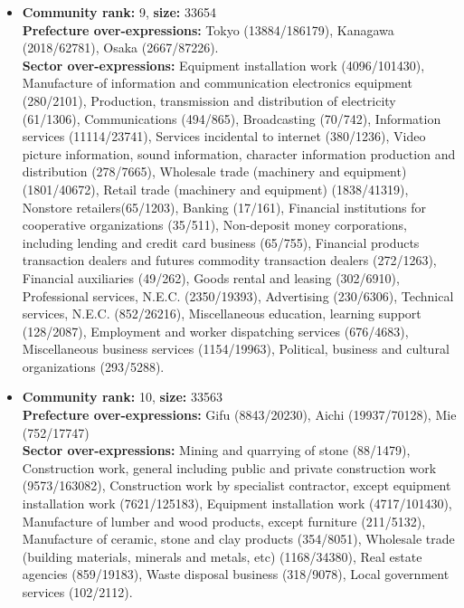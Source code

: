 \documentclass[pre,floatfix,twocolumn,showpacs,a4paper,nofootinbib]{revtex4}
\begin{document}
\begin {itemize}
 Wholesale trade, general merchandise (246/4891), Miscellaneous wholesale trade (2373/34637), Miscellaneous retail trade (4586/63111),
 Nonstore retailers (256/1203), Financial products transaction dealers and futures commodity transaction dealers (72/1263), 
 Goods rental and leasing (483/6910), Professional services, N.E.C. (2821/19393), Advertising (2572/6306),  Services for amusement and recreation(1225/8242),
 School education (529/3416), Miscellaneous education, learning support (718/2087), Employment and worker dispatching services (558/4683),
 Miscellaneous business services(1701/19963), Political, business and cultural organizations (411/5288).
\item {\bf Community rank:} 9, {\bf size:} 33654\\
 {\bf Prefecture over-expressions:} Tokyo (13884/186179), Kanagawa (2018/62781), Osaka (2667/87226).\\
 {\bf Sector over-expressions:}  Equipment installation work (4096/101430), Manufacture of information and communication electronics equipment (280/2101),
 Production, transmission and distribution of electricity (61/1306), Communications (494/865), Broadcasting (70/742), Information services (11114/23741),
 Services incidental to internet (380/1236), Video picture information, sound information, character information production and distribution (278/7665),
 Wholesale trade (machinery and equipment) (1801/40672), Retail trade (machinery and equipment) (1838/41319), Nonstore retailers(65/1203),
 Banking (17/161), Financial institutions for cooperative organizations (35/511), Non-deposit money corporations, including lending and credit card business (65/755),
 Financial products transaction dealers and futures commodity transaction dealers (272/1263), Financial auxiliaries (49/262),
 Goods rental and leasing (302/6910), Professional services, N.E.C. (2350/19393), Advertising (230/6306), Technical services, N.E.C. (852/26216),
 Miscellaneous education, learning support (128/2087), Employment and worker dispatching services (676/4683), Miscellaneous business services (1154/19963), 
 Political, business and cultural organizations (293/5288).
 
 \item {\bf Community rank:} 10, {\bf size:} 33563\\
 {\bf Prefecture over-expressions:} Gifu (8843/20230), Aichi (19937/70128), Mie (752/17747) \\
 {\bf Sector over-expressions:} Mining and quarrying of stone (88/1479), Construction work, general including public and private construction work (9573/163082),
 Construction work by specialist contractor, except equipment installation work (7621/125183), Equipment installation work (4717/101430),
 Manufacture of lumber and wood products, except furniture (211/5132), Manufacture of ceramic, stone and clay products (354/8051), 
 Wholesale trade  (building materials, minerals and metals, etc) (1168/34380), Real estate agencies (859/19183), Waste disposal business (318/9078),
 Local government services (102/2112).
\end{itemize}
\end{document}
